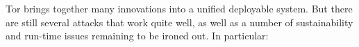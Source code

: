 \documentclass[times,10pt,twocolumn]{article}
\begin{document}
%






\label{sec:conclusion}


Tor brings together many innovations into
a unified deployable system. But there are still several attacks that
work quite well, as well as a number of sustainability and run-time
issues remaining to be ironed out. In particular:
\end{document}
